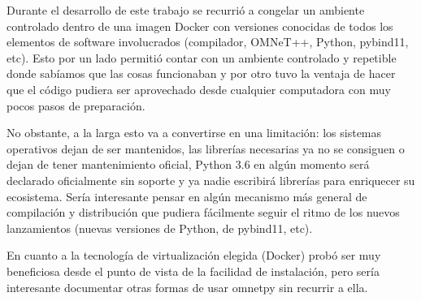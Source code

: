 \documentclass[]{article}
\begin{document}
Durante el desarrollo de este trabajo se recurrió a congelar un ambiente
controlado dentro de una imagen Docker con versiones conocidas de todos los
elementos de software involucrados (compilador, OMNeT++, Python, pybind11,
etc). Esto por un lado permitió contar con un ambiente controlado y repetible
donde sabíamos que las cosas funcionaban y por otro tuvo la ventaja de hacer
que el código pudiera ser aprovechado desde cualquier computadora con muy pocos
pasos de preparación.

No obstante, a la larga esto va a convertirse en una limitación: los sistemas
operativos dejan de ser mantenidos, las librerías necesarias ya no se consiguen
o dejan de tener mantenimiento oficial, Python 3.6 en algún momento será
declarado oficialmente sin soporte y ya nadie escribirá librerías para
enriquecer su ecosistema. Sería interesante pensar en algún mecanismo más
general de compilación y distribución que pudiera fácilmente seguir el ritmo de
los nuevos lanzamientos (nuevas versiones de Python, de pybind11, etc).

En cuanto a la tecnología de virtualización elegida (Docker) probó ser muy
beneficiosa desde el punto de vista de la facilidad de instalación, pero sería
interesante documentar otras formas de usar omnetpy sin recurrir a ella.
\end{document}
